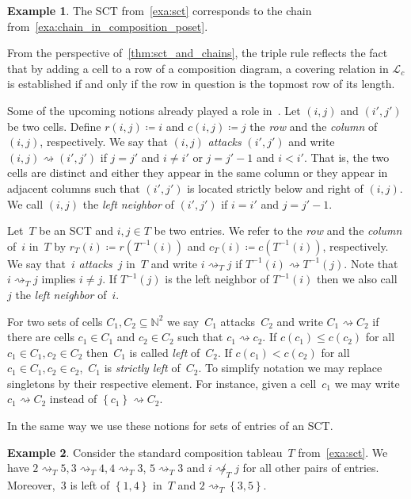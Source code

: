 \documentclass[10pt]{amsart}
\theoremstyle{plain}
\theoremstyle{plain}
\theoremstyle{plain}
\theoremstyle{plain}
\theoremstyle{plain}
\theoremstyle{definition}
\theoremstyle{definition}
\newtheorem{exam}[exam]{Example}
\newcommand{\mc}[1]{\mathcal{#1} }
\newcommand{\N}{\mathbb N}
\newcommand{\set}[1]{\left\{ #1 \right\}}
\newcommand{\att}{\rightsquigarrow}
\newcommand{\natt}{\not \rightsquigarrow}
\begin{document}
\begin{exam}
	The SCT from~\cref{exa:sct} 	corresponds to the chain from~\cref{exa:chain_in_composition_poset}.	
\end{exam}

From the perspective of~\cref{thm:sct_and_chains}, the triple rule reflects the fact that by adding a cell to a row of a composition diagram, a covering relation in $\mc L_c$ is established if and only if the row in question is the topmost row of its length.

Some of the upcoming notions already played a role in~\cite{Tewari2015}.
Let $(i,j)$ and $(i',j')$ be two cells.
Define $r(i,j) \coloneqq i$ and $c(i,j) \coloneqq j$ the \emph{row} and the \emph{column} of $(i,j)$, respectively. 
We say that $(i,j)$ \emph{attacks} $(i',j')$ and write $(i,j)\att (i',j')$ if $j=j'$ and $i\neq i'$ or $j = j'-1$ and $i<i'$.
That is, the two cells are distinct and either they appear in the same column or they appear in adjacent columns such that $(i',j')$ is located strictly below and right of $(i,j)$.
We call $(i,j)$ the \emph{left neighbor} of $(i',j')$ if $i=i'$ and $j = j'-1$.

Let~$T$ be an SCT and $i,j\in T$ be two entries.
We refer to the \emph{row} and the \emph{column} of~$i$ in~$T$ by $r_T(i) \coloneqq r(T^{-1}(i))$ and $c_T(i)\coloneqq c(T^{-1}(i))$, respectively. 
We say that~$i$ \emph{attacks}~$j$ in~$T$ and write $i\att_T j$ if $T^{-1}(i) \att T^{-1}(j)$.
Note that $i\att_T j$ implies $i\neq j$. 
If $T^{-1}(j)$ is the left neighbor of $T^{-1}(i)$ then we also call~$j$ the \emph{left neighbor} of~$i$.

For two sets of cells $C_1, C_2 \subseteq \N^2$ we say~$C_1$ attacks~$C_2$ and write $C_1 \att C_2$ if there are cells $c_1\in C_1$ and $c_2 \in C_2$ such that $c_1 \att c_2$. 
If $c(c_1)\leq c(c_2)$ for all $c_1\in C_1, c_2\in C_2$ then~$C_1$ is called \emph{left} of~$C_2$. If $c(c_1)< c(c_2)$ for all $c_1\in C_1, c_2\in c_2$,~$C_1$ is \emph{strictly left} of~$C_2$.
To simplify notation we may replace singletons by their respective element.
For instance, given a cell~$c_1$ we may write $c_1 \att C_2$ instead of $\set{c_1} \att C_2$.

In the same way we use these notions for sets of entries of an SCT.

\begin{exam}
		Consider the standard composition tableau~$T$ from~\cref{exa:sct}. We have $2\att_T 5, 3\att_T 4, 4\att_T 3$, $5\att_T 3$ and $i\natt_T j$ for all other pairs of entries. Moreover,~$3$ is left of $\set{1,4}$ in~$T$ and $2\att_T \set{3,5}$.
\end{exam}
\end{document}
